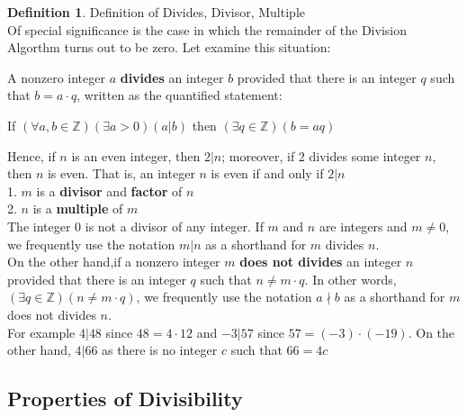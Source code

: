 \documentclass{book}
\theoremstyle{definition}
\newtheorem{definition}{Definition}[section]
\theoremstyle{remark}
\newcommand{\bb}[1]{\mathbb{#1}}
\newcommand{\m}{\cdot}
\begin{document}
\begin{definition}
Definition of Divides, Divisor, Multiple \\

Of special significance is the case in which the remainder of the Division Algorthm turns out to be zero. Let examine this situation: 



\begin{tcolorbox}
A nonzero integer $a$ {\bf divides} an integer $b$ provided that there is an integer $q$ such that $b = a \m q$, written as the quantified statement: 
	\begin{center}
		If $(\forall a, b \in \bb{Z})(\exists a > 0)(a | b)$ then  $(\exists q \in \bb{Z})(b = aq)$
	\end{center}
\end{tcolorbox}

Hence, if $n$ is an even integer, then $2 | n$; moreover, if 2 divides some integer $n$, then $n$ is even. That is, an integer $n$ is even if and only if $2 | n$ \\
1. $m$ is a {\bf divisor} and {\bf factor} of $n$ \\
2. $n$ is a {\bf multiple} of $m$ \\
The integer $0$ is not a divisor of any integer. If $m$ and $n$ are integers and $m \neq 0$, we frequently use the notation $m | n$ as a shorthand for $m$ divides $n$. \\

On the other hand,if a nonzero integer $m$ {\bf does not divides} an integer $n$ provided that there is an integer $q$ such that $n \neq m \m q$. In other words, $(\exists q \in \bb{Z})(n \neq m \m q)$, we frequently use the notation $a \nmid b$ as a shorthand for $m$ does not divides $n$. \\

For example $4|48$ since $48 = 4 \m 12$ and $-3|57$ since $57 = (-3) \m (-19)$. On the other hand, $4|66$ as there is no integer $c$ such that $66 = 4c$ 

\end{definition} 


\newpage
\subsection{Properties of Divisibility} 
\end{document}
